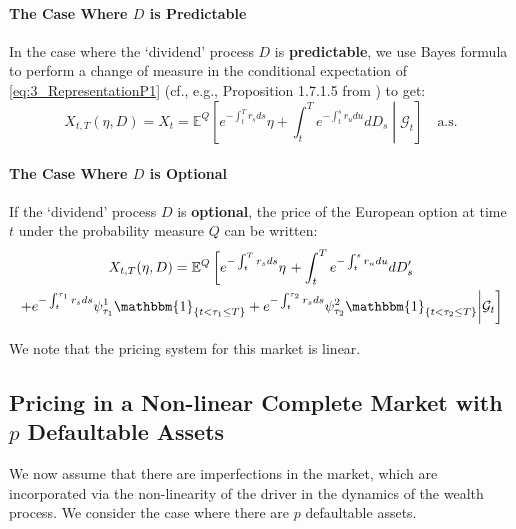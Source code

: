 \documentclass[11pt,a4paper]{article}
\numberwithin{equation}{section}
\theoremstyle{newPlain}
\theoremstyle{newDefinition}
\theoremstyle{newRemark}
\begin{document}
\paragraph{The Case Where $D$ is Predictable}
In the case where the `dividend' process $D$ is \textbf{predictable}, we  use Bayes formula to perform a change of measure in the conditional expectation of \eqref{eq:3_RepresentationP1} (cf., e.g.,  Proposition 1.7.1.5 from \cite{jeanblanc2009mathematical}) to get:
\begin{equation}\label{eq:3_RPQ}
    X_{t,T}(\eta,D) = X_t = \mathbb{E}^Q\left[e^{-\int_t^Tr_sds}\eta + \int_t^Te^{-\int_t^sr_udu}dD_s\middle|\mathcal{G}_t\right]\quad\text{a.s.}
\end{equation}
\paragraph{The Case Where $D$ is Optional}
If the `dividend' process $D$ is \textbf{optional}, the price of the European option at time $t$ under the probability measure $Q$ can be written:
\begin{multline}\label{eq:3_RepresentationP3}
    X_{t,T}(\eta,D) = \mathbb{E}^Q\left[e^{-\int_t^Tr_sds}\eta \right.+ \int_t^Te^{-\int_t^sr_udu}dD_s'\\\left.+e^{-\int_t^{\tau_1}r_sds}\psi_{\tau_1}^1\mathbbm{1}_{\{t<\tau_1\le T\}}+e^{-\int_t^{\tau_2}r_sds}\psi_{\tau_2}^2\mathbbm{1}_{\{t<\tau_2\le T\}}\middle|\mathcal{G}_t\right]
\end{multline}

We note that the pricing system for this market is linear.

\subsection{\texorpdfstring{Pricing in a Non-linear Complete Market with $p$ Defaultable Assets}{Pricing in a Non-linear Complete Market with p Defaultable Assets}}\label{subsec:non-linearPricingCompleteMarket}

We now assume that there are imperfections in the market, which are incorporated via the non-linearity of the driver in the dynamics of the wealth process. We consider the case where there are $p$ defaultable assets.
\end{document}
